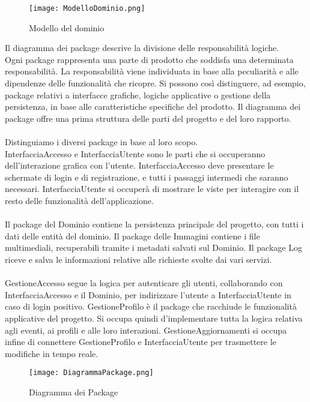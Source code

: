 \begin{figure}[h!]
    \begin{center}
        \texttt{[image: ModelloDominio.png]}
        \caption{Modello del dominio}
    \end{center}
\end{figure}

Il diagramma dei package descrive la divisione delle responsabilità logiche.\\
Ogni package rappresenta una parte di prodotto che soddisfa una determinata responsabilità.
La responsabilità viene individuata in base alla peculiarità e
alle dipendenze delle funzionalità che ricopre.
Si possono così distinguere, ad esempio, package relativi a interfacce grafiche, logiche applicative o gestione della persistenza,
in base alle caratteristiche specifiche del prodotto.
Il diagramma dei package offre una prima struttura delle parti del progetto e del loro rapporto.\\
\\
Distinguiamo i diversi package in base al loro scopo.\\
InterfacciaAccesso e InterfacciaUtente sono le parti che si occuperanno dell'interazione grafica con l'utente.
InterfacciaAccesso deve presentare le schermate di login e di registrazione,
e tutti i passaggi intermedi che saranno necessari.
InterfacciaUtente si occuperà di mostrare le viste per interagire con il resto delle funzionalità dell'applicazione.\\
\\
Il package del Dominio contiene la persistenza principale del progetto,
con tutti i dati delle entità del dominio.
Il package delle Immagini contiene i file multimediali,
recuperabili tramite i metadati salvati sul Dominio.
Il package Log riceve e salva le informazioni relative alle richieste svolte dai vari servizi.\\
\\
GestioneAccesso segue la logica per autenticare gli utenti,
collaborando con InterfacciaAccesso e il Dominio,
per indirizzare l'utente a InterfacciaUtente in caso di login positivo.
GestioneProfilo è il package che racchiude le funzionalità applicative del progetto.
Si occupa quindi d'implementare tutta la logica relativa agli eventi, ai profili e alle loro interazioni.
GestioneAggiornamenti si occupa infine di connettere GestioneProfilo e InterfacciaUtente
per trasmettere le modifiche in tempo reale.\\

\begin{figure}[h!]
    \begin{center}
        \texttt{[image: DiagrammaPackage.png]}
        \caption{Diagramma dei Package}
    \end{center}
\end{figure}
\clearpage

